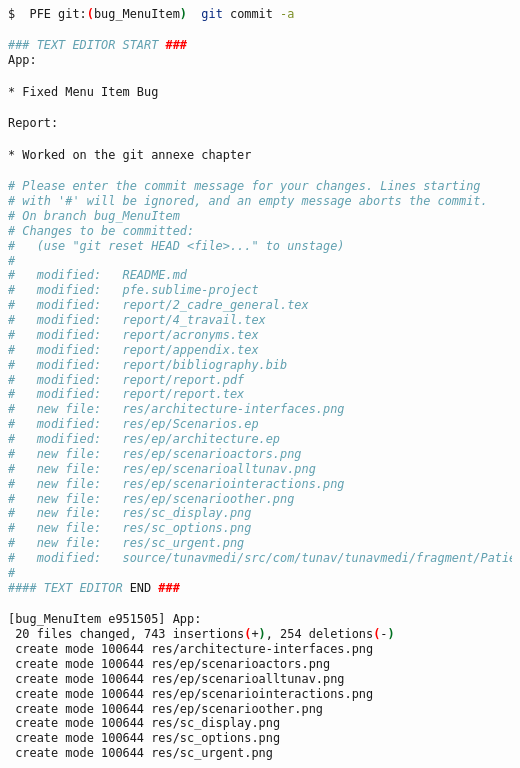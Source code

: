 \begin{lstlisting}[language=bash, label=lst:git_commit, caption=Git Commit]

$  PFE git:(bug_MenuItem)  git commit -a

### TEXT EDITOR START ###
App:

* Fixed Menu Item Bug

Report:

* Worked on the git annexe chapter

# Please enter the commit message for your changes. Lines starting
# with '#' will be ignored, and an empty message aborts the commit.
# On branch bug_MenuItem
# Changes to be committed:
#   (use "git reset HEAD <file>..." to unstage)
#
#   modified:   README.md
#   modified:   pfe.sublime-project
#   modified:   report/2_cadre_general.tex
#   modified:   report/4_travail.tex
#   modified:   report/acronyms.tex
#   modified:   report/appendix.tex
#   modified:   report/bibliography.bib
#   modified:   report/report.pdf
#   modified:   report/report.tex
#   new file:   res/architecture-interfaces.png
#   modified:   res/ep/Scenarios.ep
#   modified:   res/ep/architecture.ep
#   new file:   res/ep/scenarioactors.png
#   new file:   res/ep/scenarioalltunav.png
#   new file:   res/ep/scenariointeractions.png
#   new file:   res/ep/scenarioother.png
#   new file:   res/sc_display.png
#   new file:   res/sc_options.png
#   new file:   res/sc_urgent.png
#   modified:   source/tunavmedi/src/com/tunav/tunavmedi/fragment/PatientListFragment.java
#
#### TEXT EDITOR END ###

[bug_MenuItem e951505] App:
 20 files changed, 743 insertions(+), 254 deletions(-)
 create mode 100644 res/architecture-interfaces.png
 create mode 100644 res/ep/scenarioactors.png
 create mode 100644 res/ep/scenarioalltunav.png
 create mode 100644 res/ep/scenariointeractions.png
 create mode 100644 res/ep/scenarioother.png
 create mode 100644 res/sc_display.png
 create mode 100644 res/sc_options.png
 create mode 100644 res/sc_urgent.png

\end{lstlisting}

